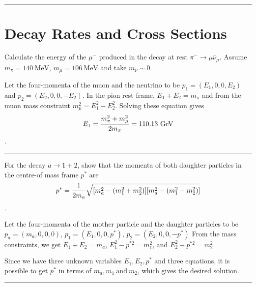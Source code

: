 \noindent\rule{7in}{2.8pt}
\section{Decay Rates and Cross Sections}

\begin{problem}{3.1}
Calculate the energy of the $\mu^-$ produced in the decay at rest $\pi^- \rightarrow \mu\bar{\nu}_{\mu}$.
Assume $m_{\pi} = \mathrm{140 \ MeV}$, $m_{\mu} = \mathrm{106 \ MeV}$ and take $m_{\nu} \sim 0$.
\end{problem}

\begin{solution}
Let the four-momenta of the muon and the neutrino to be $p_1 = (E_1, 0, 0, E_2)$ and $p_2 = (E_2, 0, 0, -E_2)$.
In the pion rest frame, $E_1 + E_2 = m_{\pi}$ and from the muon mass constraint $m_{\mu}^2 = E_1^2 - E_2^2$.
Solving these equation gives 
$$E_1 = {m_{\pi}^2 + m_{\mu}^2 \over 2m_{\pi}} = \mathrm{110.13 \ GeV}$$.

\end{solution} 
\noindent\rule{7in}{1.5pt}


\begin{problem}{3.2}
For the decay $a \rightarrow 1 + 2$, show that the momenta of both daughter particles
in the centre-of mass frame $p^*$ are
$$p^* = {1 \over 2m_a}\sqrt{[m_a^2 - (m_1^2 + m_2^2)][m_a^2 - (m_1^2 - m_2^2)]}$$.
\end{problem}

\begin{solution}
Let the four-momenta of the mother particle and the daughter particles to be
$p_a = (m_a, 0, 0, 0)$, $p_1 = (E_1, 0, 0, p^*)$, $p_2 = (E_2, 0, 0, -p^*)$
From the mass constraints, we get $E_1 + E_2 = m_a$, $E_1^2 - p^{*2} = m_1^2$, and 
$E_2^2 - p^{*2} = m_2^2$.

Since we have three unknown variables $E_1, E_2, p^*$ and three equations,
it is possible to get $p^*$ in terms of $m_a, m_1 \ \mathrm{and} \ m_2$, which gives
the desired solution.

\end{solution} 
\noindent\rule{7in}{1.5pt}


    